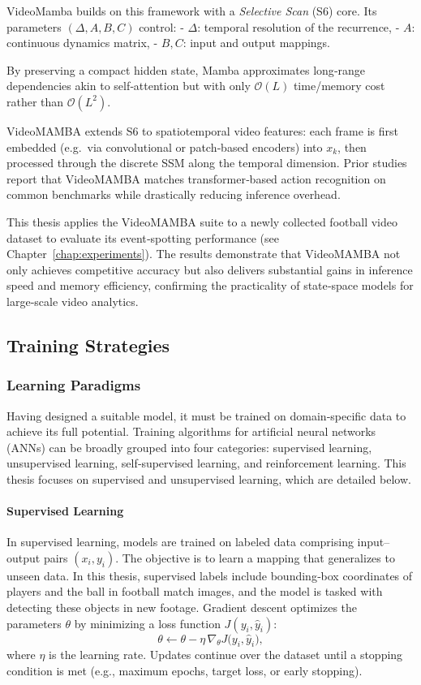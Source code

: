VideoMamba \cite{li_videomamba_2024} builds on this framework with a \emph{Selective Scan} (S6) core.  Its parameters \((\Delta, A,B,C)\) control:
- \(\Delta\): temporal resolution of the recurrence,  
- \(A\): continuous dynamics matrix,  
- \(B,C\): input and output mappings.

By preserving a compact hidden state, Mamba approximates long‐range dependencies akin to self‐attention but with only \(\mathcal{O}(L)\) time/memory cost rather than \(\mathcal{O}(L^2)\).  

VideoMAMBA extends S6 to spatiotemporal video features: each frame is first embedded (e.g.\ via convolutional or patch‐based encoders) into \(x_k\), then processed through the discrete SSM along the temporal dimension.  Prior studies \cite{lee_enhancing_mamba_s6_2024, li_videomamba_2024} report that VideoMAMBA matches transformer‐based action recognition on common benchmarks while drastically reducing inference overhead.

This thesis applies the VideoMAMBA suite to a newly collected football video dataset to evaluate its event‐spotting performance (see Chapter~\ref{chap:experiments}).  The results demonstrate that VideoMAMBA not only achieves competitive accuracy but also delivers substantial gains in inference speed and memory efficiency, confirming the practicality of state‐space models for large‐scale video analytics.


\subsection{Training Strategies}
\label{ssec:training_stratergies}
\subsubsection{Learning Paradigms}
Having designed a suitable model, it must be trained on domain‑specific data to achieve its full potential. Training algorithms for artificial neural networks (ANNs) can be broadly grouped into four categories: supervised learning, unsupervised learning, self‑supervised learning, and reinforcement learning. This thesis focuses on supervised and unsupervised learning, which are detailed below.

\paragraph{Supervised Learning}
In supervised learning, models are trained on labeled data comprising input–output pairs \((x_i, y_i)\). The objective is to learn a mapping that generalizes to unseen data. In this thesis, supervised labels include bounding‑box coordinates of players and the ball in football match images, and the model is tasked with detecting these objects in new footage. Gradient descent optimizes the parameters \(\theta\) by minimizing a loss function \(J(y_i, \hat y_i)\):  
\[
\theta \leftarrow \theta - \eta \,\nabla_{\theta}J\bigl(y_i,\hat y_i\bigr),
\]
where \(\eta\) is the learning rate. Updates continue over the dataset until a stopping condition is met (e.g., maximum epochs, target loss, or early stopping).

